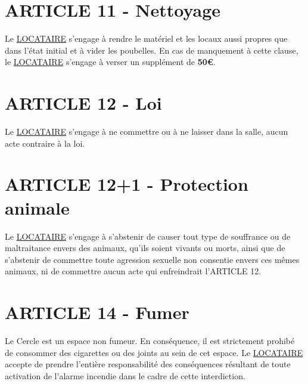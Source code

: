 \documentclass{article}
\begin{document}
\section*{ARTICLE 11 - Nettoyage}
Le \underline{LOCATAIRE} s’engage à rendre le matériel et les locaux aussi propres que dans l’état initial et à vider les poubelles. En cas de manquement à cette clause, le \underline{LOCATAIRE} s’engage à verser un supplément de \textbf{50€}.

\section*{ARTICLE 12 - Loi}
Le \underline{LOCATAIRE} s’engage à ne commettre ou à ne laisser dans la salle, aucun acte contraire à la loi.

\section{ARTICLE 12+1 - Protection animale}
Le \underline{LOCATAIRE} s'engage à s'abstenir de causer tout type de souffrance ou de maltraitance envers des animaux, qu'ils soient vivants ou morts, ainsi que de s'abstenir de commettre toute agression sexuelle non consentie envers ces mêmes animaux, ni de commettre aucun acte qui enfreindrait l'ARTICLE 12.

\section{ARTICLE 14 - Fumer}
Le Cercle est un espace non fumeur.  En conséquence, il est strictement prohibé de consommer des cigarettes ou des joints au sein de cet espace. Le \underline{LOCATAIRE} accepte de prendre l'entière responsabilité des conséquences résultant de toute activation de l'alarme incendie dans le cadre de cette interdiction.
\end{document}
